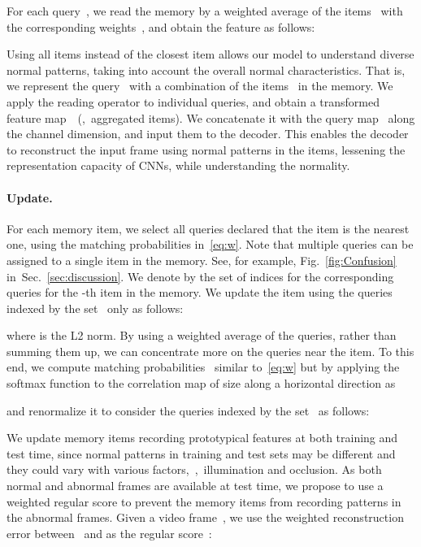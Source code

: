 \documentclass[10pt,twocolumn,letterpaper]{article}
\begin{document}
For each query~, we read the memory by a weighted average of the items~ with the corresponding weights~, and obtain the feature  as follows:
				
Using all items instead of the closest item allows our model to understand diverse normal patterns, taking into account the overall normal characteristics. That is, we represent the query~ with a combination of the items~ in the memory. We apply the reading operator to individual queries, and obtain a transformed feature map~~(\ie,~aggregated items). We concatenate it with the query map~ along the channel dimension, and input them to the decoder. This enables the decoder to reconstruct the input frame using normal patterns in the items, lessening the representation capacity of CNNs, while understanding the normality. 
			

\vspace{-0.4cm}
		\paragraph{Update.}
For each memory item, we select all queries declared that the item is the nearest one, using the matching probabilities in~\eqref{eq:w}. Note that multiple queries can be assigned to a single item in the memory. See, for example, Fig.~\ref{fig:Confusion} in~Sec.~\ref{sec:discussion}. We denote by  the set of indices for the corresponding queries for the -th item in the memory. We update the item using the queries indexed by the set~ only as follows:


 where  is the L2 norm. By using a weighted average of the queries, rather than summing them up, we can concentrate more on the queries near the item. To this end, we compute matching probabilities~ similar to~\eqref{eq:w} but by applying the softmax function to the correlation map of size  along a horizontal direction as 
			
and renormalize it to consider the queries indexed by the set~ as follows:
			



We update memory items recording prototypical features at both training and test time, since normal patterns in training and test sets may be different and they could vary with various factors,~\eg,~illumination and occlusion. As both normal and abnormal frames are available at test time, we propose to use a weighted regular score to prevent the memory items from recording patterns in the abnormal frames. Given a video frame~, we use the weighted reconstruction error between~ and  as the regular score~: 
			
\end{document}
